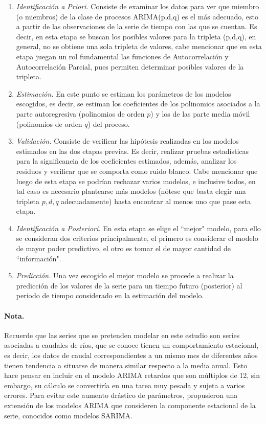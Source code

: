 \documentclass[12pt,oneside]{book}\usepackage[]{graphicx}\usepackage[]{color}
\theoremstyle{definition} %
\begin{document}
\begin{enumerate}
\item \textit{Identificación a Priori.} Consiste de examinar los datos para ver que miembro (o miembros) de la clase de procesos ARIMA(p,d,q) es el más adecuado, esto a partir de las observaciones de la serie de tiempo con las que se cuentan. Es decir, en esta etapa se buscan los posibles valores para la tripleta (p,d,q), en general, no se obtiene una sola tripleta de valores, cabe mencionar que en esta etapa juegan un rol fundamental las funciones de Autocorrelación y Autocorrelación Parcial, pues permiten determinar posibles valores de la tripleta.

\item \textit{Estimación.} En este punto se estiman los parámetros de los modelos escogidos, es decir, se estiman los coeficientes de los polinomios asociados a la parte autoregresiva (polinomios de orden $p$) y los de las parte media móvil (polinomios de orden $q$) del proceso.

\item \textit{Validación.} Consiste de verificar las hipótesis realizadas en los modelos estimados en las dos etapas previas. Es decir, realizar pruebas estadísticas para la significancia de los coeficientes estimados, además, analizar los residuos y verificar que se comporta como ruido blanco. Cabe mencionar que luego de esta etapa se podrían rechazar varios modelos, e inclusive todos, en tal caso es necesario plantearse más modelos (nótese que basta elegir una tripleta $p,d,q$ adecuadamente) hasta encontrar al menos uno que pase esta etapa.

\item \textit{Identificación a Posteriori.} En esta etapa se elige el ``mejor" modelo, para ello se consideran dos criterios principalmente, el primero es considerar el modelo de mayor poder predictivo, el otro es  tomar el de mayor cantidad de ``información".

\item \textit{Predicción.} Una vez escogido el mejor modelo se procede a realizar la predicción de los valores de la serie para un tiempo futuro (posterior) al periodo de tiempo considerado en la estimación del modelo.


\end{enumerate}


\paragraph{Nota.}
Recuerde que las series que se pretenden modelar en este estudio son series asociadas a caudales de ríos, que se conoce tienen un comportamiento estacional, es decir, los datos de caudal correspondientes a un mismo mes de diferentes años tienen tendencia a situarse de manera similar respecto a la media anual. Esto hace pensar en incluir en el modelo ARIMA retardos que son múltiplos de 12, sin embargo, su cálculo se convertiría en una tarea muy pesada y sujeta a varios errores. Para evitar este aumento drástico de parámetros, \citeauthor{box2015time} propusieron una extensión de los modelos ARIMA que consideren la componente estacional de la serie, conocidos como modelos SARIMA.
\end{document}
